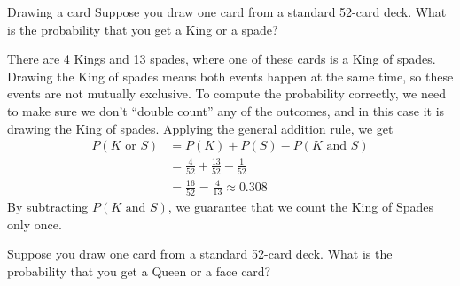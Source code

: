 \begin{example}[https://www.youtube.com/watch?v=lx7DRG6N1r8&list=PLfmpjsIzhzts14-9s5QixRje97EI2oeMF&index=13]{Drawing a card}
Suppose you draw one card from a standard 52-card deck. What is the probability that you get a King or a spade? 

\sol
There are 4 Kings and 13 spades, where one of these cards is a King of spades. Drawing the King of spades means both events happen at the same time, so these events are not mutually exclusive. To compute the probability correctly, we need to make sure we don't ``double count'' any of the outcomes, and in this case it is drawing the King of spades. Applying the general addition rule, we get
\begin{align*}
P( K \mbox{ or } S ) &= P(K) + P(S) - P(K \mbox{ and } S)\\
&= \frac{4}{52} + \frac{13}{52} - \frac{1}{52}\\
&= \boxed{\frac{16}{52} = \frac{4}{13} \approx 0.308}
\end{align*}
By subtracting $P(K \mbox{ and } S)$, we guarantee that we count the King of Spades only once.
\end{example}
\vfill
\pagebreak

\begin{try}
Suppose you draw one card from a standard 52-card deck. What is the probability that you get a Queen or a face card? 
\end{try}

